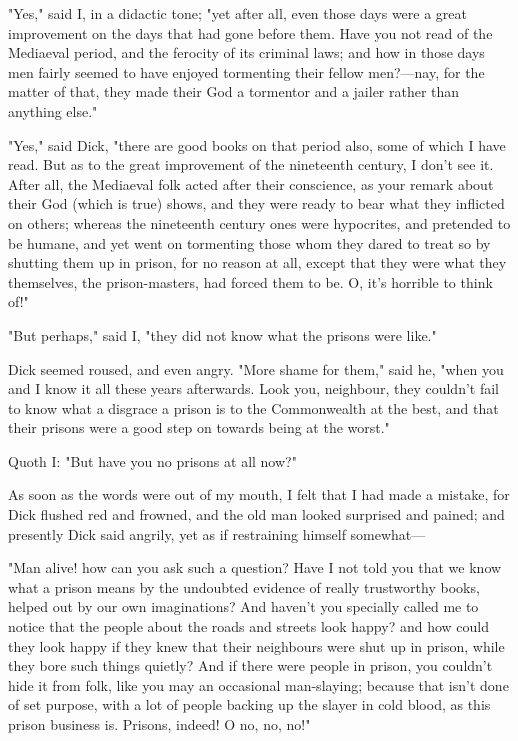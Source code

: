 "Yes," said I, in a didactic tone; "yet after all, even those days were
a great improvement on the days that had gone before them. Have you not
read of the Mediaeval period, and the ferocity of its criminal laws; and
how in those days men fairly seemed to have enjoyed tormenting their
fellow men?---nay, for the matter of that, they made their God a
tormentor and a jailer rather than anything else."

"Yes," said Dick, "there are good books on that period also, some of
which I have read. But as to the great improvement of the nineteenth
century, I don't see it. After all, the Mediaeval folk acted after their
conscience, as your remark about their God (which is true) shows, and
they were ready to bear what they inflicted on others; whereas the
nineteenth century ones were hypocrites, and pretended to be humane, and
yet went on tormenting those whom they dared to treat so by shutting
them up in prison, for no reason at all, except that they were what they
themselves, the prison-masters, had forced them to be. O, it's horrible
to think of!"

"But perhaps," said I, "they did not know what the prisons were like."

Dick seemed roused, and even angry. "More shame for them," said he,
"when you and I know it all these years afterwards. Look you, neighbour,
they couldn't fail to know what a disgrace a prison is to the
Commonwealth at the best, and that their prisons were a good step on
towards being at the worst."

Quoth I: "But have you no prisons at all now?"

As soon as the words were out of my mouth, I felt that I had made a
mistake, for Dick flushed red and frowned, and the old man looked
surprised and pained; and presently Dick said angrily, yet as if
restraining himself somewhat---

"Man alive! how can you ask such a question? Have I not told you that we
know what a prison means by the undoubted evidence of really trustworthy
books, helped out by our own imaginations? And haven't you specially
called me to notice that the people about the roads and streets look
happy? and how could they look happy if they knew that their neighbours
were shut up in prison, while they bore such things quietly? And if
there were people in prison, you couldn't hide it from folk, like you
may an occasional man-slaying; because that isn't done of set purpose,
with a lot of people backing up the slayer in cold blood, as this prison
business is. Prisons, indeed! O no, no, no!"


